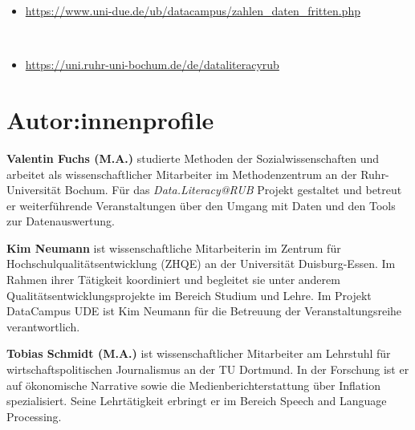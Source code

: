 \documentclass[
  letterpaper,
  DIV=11]{scrartcl}
\providecommand{\tightlist}{%
  \setlength{\itemsep}{0pt}\setlength{\parskip}{0pt}}\usepackage{longtable,booktabs,array}
\begin{document}
\begin{itemize}
\tightlist
\item
  \url{https://www.uni-due.de/ub/datacampus/zahlen_daten_fritten.php}\strut \\
\item
  \url{https://uni.ruhr-uni-bochum.de/de/dataliteracyrub}
\end{itemize}

\hypertarget{autorinnenprofile}{%
\section{Autor:innenprofile}\label{autorinnenprofile}}

\textbf{Valentin Fuchs (M.A.)} studierte Methoden der
Sozialwissenschaften und arbeitet als wissenschaftlicher Mitarbeiter im
Methodenzentrum an der Ruhr-Universität Bochum. Für das
\emph{Data.Literacy@RUB} Projekt gestaltet und betreut er weiterführende
Veranstaltungen über den Umgang mit Daten und den Tools zur
Datenauswertung.

\textbf{Kim Neumann} ist wissenschaftliche Mitarbeiterin im Zentrum für
Hochschulqualitätsentwicklung (ZHQE) an der Universität Duisburg-Essen.
Im Rahmen ihrer Tätigkeit koordiniert und begleitet sie unter anderem
Qualitätsentwicklungsprojekte im Bereich Studium und Lehre. Im Projekt
DataCampus UDE ist Kim Neumann für die Betreuung der Veranstaltungsreihe
verantwortlich.

\textbf{Tobias Schmidt (M.A.)} ist wissenschaftlicher Mitarbeiter am
Lehrstuhl für wirtschaftspolitischen Journalismus an der TU Dortmund. In
der Forschung ist er auf ökonomische Narrative sowie die
Medienberichterstattung über Inflation spezialisiert. Seine
Lehrtätigkeit erbringt er im Bereich Speech and Language Processing.
\end{document}
